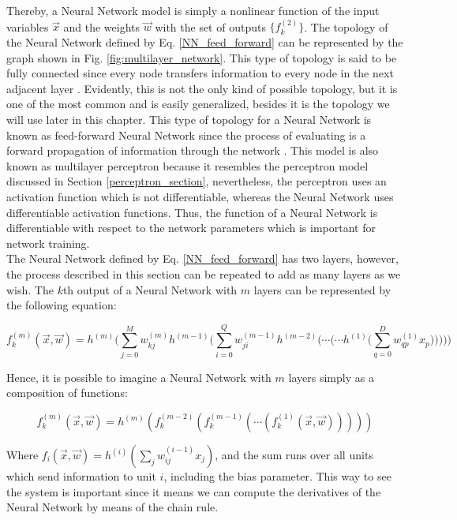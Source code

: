 Thereby, a Neural Network model is simply a nonlinear function of the input variables $\vec{x}$ and the weights $\vec{w}$ with the set of outputs $\{ f_{k}^{(2)} \}$. The topology of the Neural Network defined by Eq. \ref{NN_feed_forward} can be represented by the graph shown in Fig. \ref{fig:multilayer_network}. This type of topology is said to be fully connected since every node transfers information to every node in the next adjacent layer \cite{deep_learning}. Evidently, this is not the only kind of possible topology, but it is one of the most common and is easily generalized, besides it is the topology we will use later in this chapter. This type of topology for a Neural Network is known as feed-forward Neural Network since the process of evaluating is a forward propagation of information through the network \cite{machine_bishop}. This model is also known as multilayer perceptron because it resembles the perceptron model discussed in Section \ref{perceptron_section}, nevertheless, the perceptron uses an activation function which is not differentiable, whereas the Neural Network uses differentiable activation functions. Thus, the function of a Neural Network is differentiable with respect to the network parameters which is important for network training.\\

The Neural Network defined by Eq. \ref{NN_feed_forward} has two layers, however, the process described in this section can be repeated to add as many layers as we wish. The $k$th output of a Neural Network with $m$ layers can be represented by the following equation:

\begin{equation}
\label{NN_feed_forward_full}
	 f_{k}^{(m)}(\vec{x},\vec{w})=h^{(m)} \bigg( \sum_{j=0}^{M} w_{kj}^{(m)} h^{(m-1)} \bigg( \sum_{i=0}^{Q} w_{ji}^{(m-1)} h^{(m-2)} \bigg( \cdots \bigg( \cdots h^{(1)} \bigg( \sum_{q=0}^{D} w_{qp}^{(1)}x_{p} \bigg) \bigg)  \bigg) \bigg) \bigg)
\end{equation}

Hence, it is possible to imagine a Neural Network with $m$ layers simply as a composition of functions:

\begin{equation}
	f_{k}^{(m)}(\vec{x},\vec{w})= h^{(m)}(f_{k}^{(m-2)}(f_{k}^{(m-1)}( \cdots ( f_{k}^{(1)}(\vec{x},\vec{w})))))
\end{equation}

Where $f_{i}(\vec{x},\vec{w})= h^{(i)} (\sum_{j} w_{ij}^{(i-1)} x_{j}) $, and the sum runs over all units which send information to unit $i$, including the bias parameter. This way to see the system is important since it means we can compute the derivatives of the Neural Network by means of the chain rule.\\

